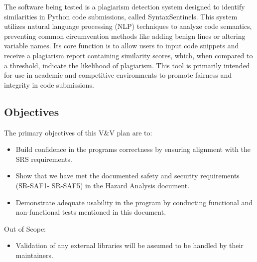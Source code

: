 \documentclass[12pt, titlepage]{article}
\begin{document}
  The software being tested is a plagiarism detection system designed to identify similarities in Python code submissions, called SyntaxSentinels. 
  This system utilizes natural language processing (NLP) techniques to analyze code semantics, preventing common circumvention methods 
  like adding benign lines or altering variable names. Its core function is to allow users to input code snippets and receive a plagiarism 
  report containing similarity scores, which, when compared to a threshold, indicate the likelihood of plagiarism. This tool is primarily 
  intended for use in academic and competitive environments to promote fairness and integrity in code submissions.

\subsection{Objectives}

The primary objectives of this V\&V plan are to:
\begin{itemize}
  \item Build confidence in the programs correctness by ensuring alignment with the SRS requirements.
  \item Show that we have met the documented safety and security requirements (SR-SAF1- SR-SAF5) in the Hazard Analysis document.
  \item Demonstrate adequate usability in the program by conducting functional and non-functional tests mentioned in this document.
\end{itemize}

Out of Scope:
\begin{itemize}
  \item Validation of any external libraries will be assumed to be handled by their maintainers.
\end{itemize}

\end{document}
